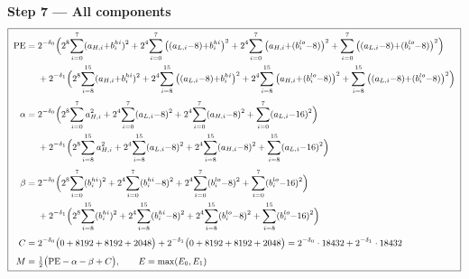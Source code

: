 \documentclass[fleqn]{article}
\begin{document}
\textbf{Step 7 --- All components}
{\setlength{\mathindent}{0em}
\[
\small
\boxed{\;
\begin{aligned}
\mathrm{PE} ={}& 2^{-\delta_0}\Big(2^{8}\!\sum_{i=0}^{7}(a_{H,i}{+}b_i^{hi})^2 + 2^{4}\!\sum_{i=0}^{7}\big((a_{L,i}{-}8){+}b_i^{hi}\big)^2 + 2^{4}\!\sum_{i=0}^{7}\big(a_{H,i}{+}(b_i^{lo}{-}8)\big)^2 + \sum_{i=0}^{7}\big((a_{L,i}{-}8){+}(b_i^{lo}{-}8)\big)^2\Big) \\
  & + 2^{-\delta_1}\Big(2^{8}\!\sum_{i=8}^{15}(a_{H,i}{+}b_i^{hi})^2 + 2^{4}\!\sum_{i=8}^{15}\big((a_{L,i}{-}8){+}b_i^{hi}\big)^2 + 2^{4}\!\sum_{i=8}^{15}\big(a_{H,i}{+}(b_i^{lo}{-}8)\big)^2 + \sum_{i=8}^{15}\big((a_{L,i}{-}8){+}(b_i^{lo}{-}8)\big)^2\Big) \\[0.3em]
\alpha ={}& 2^{-\delta_0}\Big(2^{8}\!\sum_{i=0}^{7}a_{H,i}^2 + 2^{4}\!\sum_{i=0}^{7}(a_{L,i}{-}8)^2 + 2^{4}\!\sum_{i=0}^{7}(a_{H,i}{-}8)^2 + \sum_{i=0}^{7}(a_{L,i}{-}16)^2\Big) \\
  & + 2^{-\delta_1}\Big(2^{8}\!\sum_{i=8}^{15}a_{H,i}^2 + 2^{4}\!\sum_{i=8}^{15}(a_{L,i}{-}8)^2 + 2^{4}\!\sum_{i=8}^{15}(a_{H,i}{-}8)^2 + \sum_{i=8}^{15}(a_{L,i}{-}16)^2\Big) \\[0.3em]
\beta ={}& 2^{-\delta_0}\Big(2^{8}\!\sum_{i=0}^{7}(b_i^{hi})^2 + 2^{4}\!\sum_{i=0}^{7}(b_i^{hi}{-}8)^2 + 2^{4}\!\sum_{i=0}^{7}(b_i^{lo}{-}8)^2 + \sum_{i=0}^{7}(b_i^{lo}{-}16)^2\Big) \\
  & + 2^{-\delta_1}\Big(2^{8}\!\sum_{i=8}^{15}(b_i^{hi})^2 + 2^{4}\!\sum_{i=8}^{15}(b_i^{hi}{-}8)^2 + 2^{4}\!\sum_{i=8}^{15}(b_i^{lo}{-}8)^2 + \sum_{i=8}^{15}(b_i^{lo}{-}16)^2\Big) \\[0.3em]
C ={}& 2^{-\delta_0}\big(0 + 8192 + 8192 + 2048\big) + 2^{-\delta_1}\big(0 + 8192 + 8192 + 2048\big) = 2^{-\delta_0}\cdot 18432 + 2^{-\delta_1}\cdot 18432 \\[0.3em]
M ={}& \tfrac12\big(\mathrm{PE} - \alpha - \beta + C\big), \qquad E = \max(E_0,E_1)
\end{aligned}
\;}
\]
}
\end{document}
